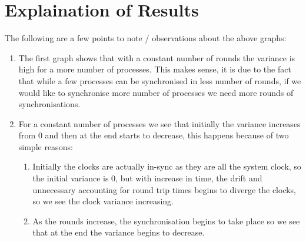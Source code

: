 \documentclass[a4paper,12pt]{report}
\begin{document}
\section{Explaination of Results}
The following are a few points to note / observations about the above graphs:
\begin{enumerate}
\item The first graph shows that with a constant number of rounds the variance is high for a more number of processes. This makes sense, it is due to the fact that while a few processes can be synchronised in less number of rounds, if we would like to synchronise more number of processes we need more rounds of synchronisations.
\item For a constant number of processes we see that initially the variance increases from 0 and then at the end starts to decrease, this happens because of two simple reasons:
\begin{enumerate}
\item Initially the clocks are actually in-sync as they are all the system clock, so the initial variance is 0, but with increase in time, the drift and unnecessary accounting for round trip times begins to diverge the clocks, so we see the clock variance increasing.
\item As the rounds increase, the synchronisation begins to take place so we see that at the end the variance begins to decrease.
\end{enumerate}
\end{enumerate}
\end{document}
